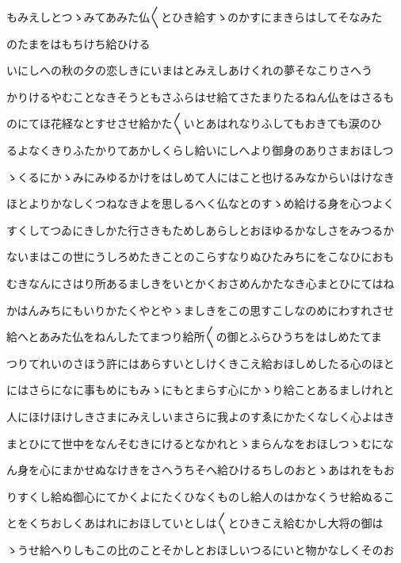 \documentclass[a4paper,11pt,landscape]{ltjtarticle}
\begin{document}
\par\medskip
もみえしとつゝみてあみた仏〱とひき給すゝのかすにまきらはしてそなみた
\par\medskip
のたまをはもちけち給ひける
\par\medskip
いにしへの秋の夕の恋しきにいまはとみえしあけくれの夢そなこりさへう
\par\medskip
かりけるやむことなきそうともさふらはせ給てさたまりたるねん仏をはさるも
\par\medskip
のにてほ花経なとすせさせ給かた〱いとあはれなりふしてもおきても涙のひ
\par\medskip
るよなくきりふたかりてあかしくらし給いにしへより御身のありさまおほしつ
\par\medskip
ゝくるにかゝみにみゆるかけをはしめて人にはこと也けるみなからいはけなき
\par\medskip
ほとよりかなしくつねなきよを思しるへく仏なとのすゝめ給ける身を心つよく
\par\medskip
すくしてつゐにきしかた行さきもためしあらしとおほゆるかなしさをみつるか
\par\medskip
ないまはこの世にうしろめたきことのこらすなりぬひたみちにをこなひにおも
\par\medskip
むきなんにさはり所あるましきをいとかくおさめんかたなき心まとひにてはね
\par\medskip
かはんみちにもいりかたくやとやゝましきをこの思すこしなのめにわすれさせ
\par\medskip
給へとあみた仏をねんしたてまつり給所〱の御とふらひうちをはしめたてま
\par\medskip
つりてれいのさほう許にはあらすいとしけくきこえ給おほしめしたる心のほと
\par\medskip
にはさらになに事もめにもみゝにもとまらす心にかゝり給ことあるましけれと
\par\medskip
人にほけほけしきさまにみえしいまさらに我よのすゑにかたくなしく心よはき
\par\medskip
まとひにて世中をなんそむきにけるとなかれとゝまらんなをおほしつゝむにな
\par\medskip
ん身を心にまかせぬなけきをさへうちそへ給ひけるちしのおとゝあはれをもお
\par\medskip
りすくし給ぬ御心にてかくよにたくひなくものし給人のはかなくうせ給ぬるこ
\par\medskip
とをくちおしくあはれにおほしていとしは〱とひきこえ給むかし大将の御は
\par\medskip
ゝうせ給へりしもこの比のことそかしとおほしいつるにいと物かなしくそのお
\par\medskip
\end{document}

